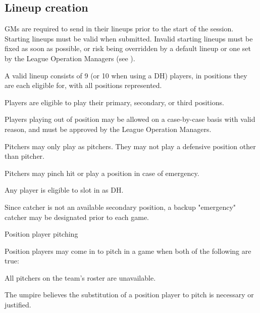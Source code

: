 \subsection{Lineup creation}
\label{sec:lineups}
\begin{deepEnumerate}
	\item GMs are required to send in their lineups prior to the start of the session. Starting lineups must be valid when submitted.
	Invalid starting lineups must be fixed as soon as possible, or risk being overridden by a default lineup 
	or one set by the League Operation Managers (see ). 
	\begin{deepEnumerate}
		\item A valid lineup consists of 9 (or 10 when using a DH) players,	in positions they are each eligible for, with all positions represented.
		\begin{deepEnumerate}
			\item Players are eligible to play their primary, secondary, or third positions.
			\item Players playing out of position may be allowed on a case-by-case basis with valid reason,	and must be approved by the League Operation Managers.
		\end{deepEnumerate}
		\item Pitchers may only play as pitchers. They may not play a defensive position other than pitcher.
		\begin{deepEnumerate}
			\item Pitchers may pinch hit or play a position in case of emergency.
		\end{deepEnumerate}
		\item Any player is eligible to slot in as DH.
		\item Since catcher is not an available secondary position,	a backup "emergency" catcher may be designated prior to each game.
		\item Position player pitching
		\begin{deepEnumerate}
			\item Position players may come in to pitch in a game when both of the following are true:
			\begin{deepEnumerate}
				\item All pitchers on the team's roster are unavailable.
				\item The umpire believes the substitution of a position player to pitch is necessary or justified.
			\end{deepEnumerate}

\end{deepEnumerate}
\end{deepEnumerate}
\end{deepEnumerate}
